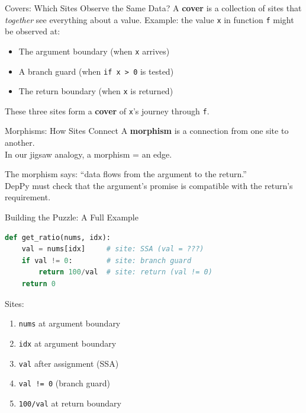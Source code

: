 \documentclass[aspectratio=169,10pt]{beamer}
\begin{document}
\begin{frame}{Covers: Which Sites Observe the Same Data?}
A \textbf{cover} is a collection of sites that \emph{together} see everything about a value.
\vspace{0.5em}
Example: the value \texttt{x} in function \texttt{f} might be observed at:
\begin{itemize}
  \item The argument boundary (when \texttt{x} arrives)
  \item A branch guard (when \texttt{if x > 0} is tested)
  \item The return boundary (when \texttt{x} is returned)
\end{itemize}
\vspace{0.3em}
These three sites form a \textbf{cover} of \texttt{x}'s journey through \texttt{f}.
\end{frame}

\begin{frame}{Morphisms: How Sites Connect}
A \textbf{morphism} is a connection from one site to another.\\
In our jigsaw analogy, a morphism = an edge.
\vspace{0.5em}
\begin{center}
\end{center}
\vspace{0.3em}
The morphism says: ``data flows from the argument to the return.''\\
DepPy must check that the argument's promise is compatible with the return's requirement.
\end{frame}

\begin{frame}[fragile]{Building the Puzzle: A Full Example}
\begin{lstlisting}[language=Python, basicstyle=\ttfamily\scriptsize]
def get_ratio(nums, idx):
    val = nums[idx]     # site: SSA (val = ???)
    if val != 0:        # site: branch guard
        return 100/val  # site: return (val != 0)
    return 0
\end{lstlisting}
\vspace{0.3em}
Sites:
\begin{enumerate}
  \item \texttt{nums} at argument boundary
  \item \texttt{idx} at argument boundary
  \item \texttt{val} after assignment (SSA)
  \item \texttt{val != 0} (branch guard)
  \item \texttt{100/val} at return boundary
\end{enumerate}
\end{frame}
\end{document}
